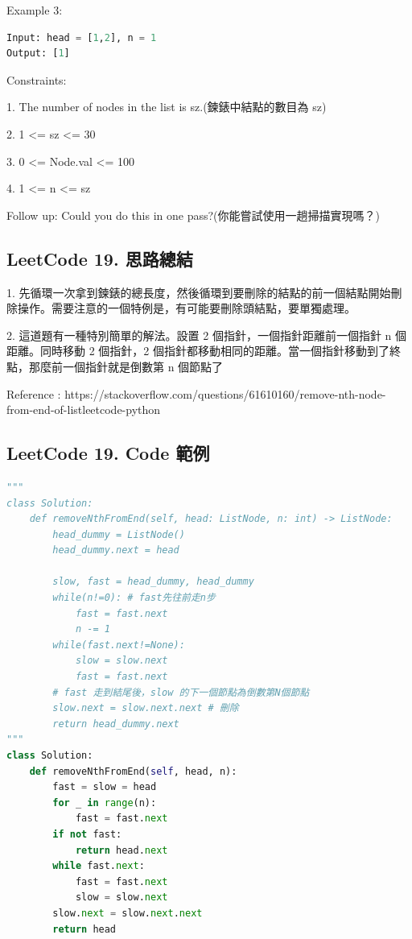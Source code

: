 \documentclass[10pt,UTF8]{ctexart}
\begin{document}
Example 3:
\begin{lstlisting}[language={python}]
Input: head = [1,2], n = 1
Output: [1]
\end{lstlisting}

Constraints:

1. The number of nodes in the list is sz.(鍊錶中結點的數目為 sz)

2. 1 <= sz <= 30

3. 0 <= Node.val <= 100

4. 1 <= n <= sz

Follow up: Could you do this in one pass?(你能嘗試使用一趟掃描實現嗎？)

\subsection{LeetCode 19. 思路總結}

1. 先循環一次拿到鍊錶的總長度，然後循環到要刪除的結點的前一個結點開始刪除操作。需要注意的一個特例是，有可能要刪除頭結點，要單獨處理。

2. 這道題有一種特別簡單的解法。設置 2 個指針，一個指針距離前一個指針 n 個距離。同時移動 2 個指針，2 個指針都移動相同的距離。當一個指針移動到了終點，那麼前一個指針就是倒數第 n 個節點了

Reference : https://stackoverflow.com/questions/61610160/remove-nth-node-from-end-of-listleetcode-python

\subsection{LeetCode 19. Code 範例}

\begin{lstlisting}[language={python}]
"""
class Solution:
    def removeNthFromEnd(self, head: ListNode, n: int) -> ListNode:
        head_dummy = ListNode()
        head_dummy.next = head

        slow, fast = head_dummy, head_dummy
        while(n!=0): # fast先往前走n步
            fast = fast.next
            n -= 1
        while(fast.next!=None):
            slow = slow.next
            fast = fast.next
        # fast 走到結尾後，slow 的下一個節點為倒數第N個節點
        slow.next = slow.next.next # 刪除
        return head_dummy.next
"""
class Solution:
    def removeNthFromEnd(self, head, n):
        fast = slow = head
        for _ in range(n):
            fast = fast.next
        if not fast:
            return head.next
        while fast.next:
            fast = fast.next
            slow = slow.next
        slow.next = slow.next.next
        return head
\end{lstlisting}
\end{document}
